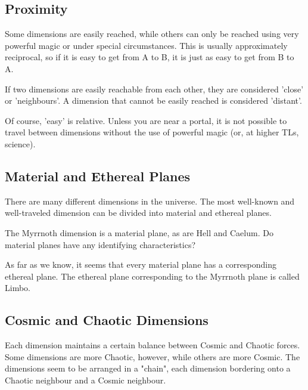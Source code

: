 \subsection{Proximity}
Some dimensions are easily reached, while others can only be reached using very powerful magic or under special circumstances. This is usually approximately reciprocal, so if it is easy to get from A to B, it is just as easy to get from B to A. 

If two dimensions are easily reachable from each other, they are considered 'close' or 'neighbours'. A dimension that cannot be easily reached is considered 'distant'. 

Of course, 'easy' is relative. Unless you are near a portal, it is not possible to travel between dimensions without the use of powerful magic (or, at higher TLs, science). 

\subsection{Material and Ethereal Planes}
There are many different dimensions in the universe. The most well-known and well-traveled dimension can be divided into material and ethereal planes. 

The Myrrnoth dimension is a material plane, as are Hell and Caelum. 
Do material planes have any identifying characteristics? 

As far as we know, it seems that every material plane has a corresponding ethereal plane. The ethereal plane corresponding to the Myrrnoth plane is called Limbo. 

\subsection{Cosmic and Chaotic Dimensions}
Each dimension maintains a certain balance between Cosmic and Chaotic forces. Some dimensions are more Chaotic, however, while others are more Cosmic. The dimensions seem to be arranged in a "chain", each dimension bordering onto a Chaotic neighbour and a Cosmic neighbour. 
